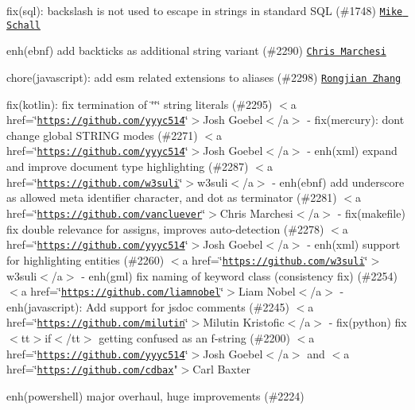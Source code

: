 \begin{DoxyItemize}
\item fix(sql)\+: backslash is not used to escape in strings in standard S\+QL (\#1748) \href{https://github.com/schallm}{\tt Mike Schall}
\item enh(ebnf) add backticks as additional string variant (\#2290) \href{https://github.com/vancluever}{\tt Chris Marchesi}
\item chore(javascript)\+: add esm related extensions to aliases (\#2298) \href{https://github.com/pd4d10}{\tt Rongjian Zhang}
\item fix(kotlin)\+: fix termination of \char`\"{}\char`\"{}\char`\"{} string literals (\#2295) $<$a href=\char`\"{}\href{https://github.com/yyyc514}{\tt https\+://github.\+com/yyyc514}\char`\"{}$>$\+Josh Goebel$<$/a$>$
-\/ fix(mercury)\+: don\textquotesingle{}t change global S\+T\+R\+I\+N\+G modes (\#2271) $<$a href=\char`\"{}\href{https://github.com/yyyc514}{\tt https\+://github.\+com/yyyc514}\char`\"{}$>$\+Josh Goebel$<$/a$>$
-\/ enh(xml) expand and improve document type highlighting (\#2287) $<$a href=\char`\"{}\href{https://github.com/w3suli}{\tt https\+://github.\+com/w3suli}\char`\"{}$>$w3suli$<$/a$>$
-\/ enh(ebnf) add underscore as allowed meta identifier character, and dot as terminator (\#2281) $<$a href=\char`\"{}\href{https://github.com/vancluever}{\tt https\+://github.\+com/vancluever}\char`\"{}$>$\+Chris Marchesi$<$/a$>$
-\/ fix(makefile) fix double relevance for assigns, improves auto-\/detection (\#2278) $<$a href=\char`\"{}\href{https://github.com/yyyc514}{\tt https\+://github.\+com/yyyc514}\char`\"{}$>$\+Josh Goebel$<$/a$>$
-\/ enh(xml) support for highlighting entities (\#2260) $<$a href=\char`\"{}\href{https://github.com/w3suli}{\tt https\+://github.\+com/w3suli}\char`\"{}$>$w3suli$<$/a$>$
-\/ enh(gml) fix naming of keyword class (consistency fix) (\#2254) $<$a href=\char`\"{}\href{https://github.com/liamnobel}{\tt https\+://github.\+com/liamnobel}\char`\"{}$>$\+Liam Nobel$<$/a$>$
-\/ enh(javascript)\+: Add support for jsdoc comments (\#2245) $<$a href=\char`\"{}\href{https://github.com/milutin}{\tt https\+://github.\+com/milutin}\char`\"{}$>$\+Milutin Kristofic$<$/a$>$
-\/ fix(python) fix $<$tt$>$if$<$/tt$>$ getting confused as an f-\/string (\#2200) $<$a href=\char`\"{}\href{https://github.com/yyyc514}{\tt https\+://github.\+com/yyyc514}\char`\"{}$>$\+Josh Goebel$<$/a$>$ and $<$a href=\char`\"{}\href{https://github.com/cdbax}{\tt https\+://github.\+com/cdbax}"$>$Carl Baxter
\item enh(powershell) major overhaul, huge improvements (\#2224)

\end{DoxyItemize}
